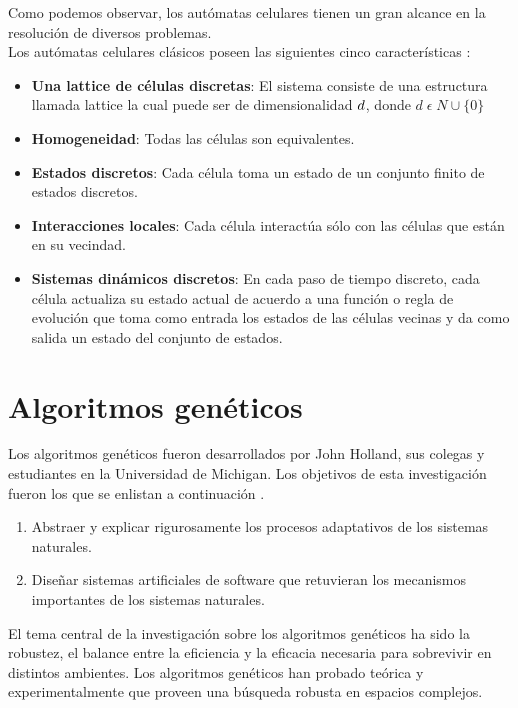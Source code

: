 Como podemos observar, los autómatas celulares tienen un gran alcance en la resolución de diversos problemas.
\\

Los autómatas celulares clásicos poseen las siguientes cinco características \citep{ilachinski2001cellular}:

\begin{itemize}
	\item{\textbf{Una lattice de células discretas}: El sistema consiste de una estructura llamada lattice la cual puede ser de dimensionalidad  $\mathnormal{d}$, donde ${d\; \epsilon\; N\cup\{0\}}$}
	\item{\textbf{Homogeneidad}: Todas las células son equivalentes.}
	\item{\textbf{Estados discretos}: Cada célula toma un estado de un conjunto finito de estados discretos.}
	\item{\textbf{Interacciones locales}: Cada célula interactúa sólo con las células que están en su vecindad.}
	\item{\textbf{Sistemas dinámicos discretos}: En cada paso de tiempo discreto, cada célula actualiza su estado actual de acuerdo a una función o regla de evolución que toma como entrada los estados de las células vecinas y da como salida un estado del conjunto de estados.}
\end{itemize}

\section{Algoritmos genéticos}

Los algoritmos genéticos fueron desarrollados por John Holland, sus colegas y estudiantes en la Universidad de Michigan. Los objetivos de esta investigación fueron los que se enlistan a continuación \citep{goldberg_2012}.
\begin{enumerate}
	\item Abstraer y explicar rigurosamente los procesos adaptativos de los sistemas naturales.
	\item Diseñar sistemas artificiales de software que retuvieran los mecanismos importantes de los sistemas naturales.
\end{enumerate}

El tema central de la investigación sobre los algoritmos genéticos ha sido la robustez, el balance entre la eficiencia y la eficacia necesaria para sobrevivir en distintos ambientes. Los algoritmos genéticos han probado teórica y experimentalmente que proveen una búsqueda robusta en espacios complejos.
\\

